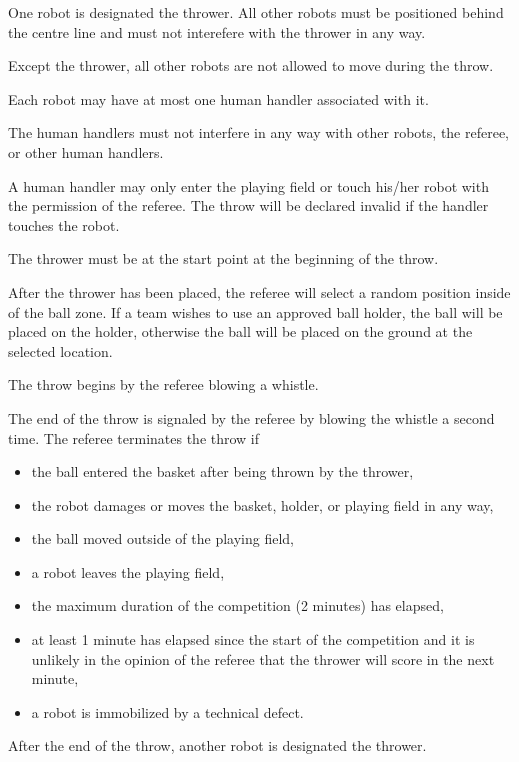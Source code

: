 \documentclass[12pt]{hurocup}
\begin{document}
\begin{lawlist}[BB]

 \item One robot is designated the thrower. All other robots must be
 positioned behind the centre line and must not interefere with the
 thrower in any way.

 \item Except the thrower, all other robots are not allowed to move
 during the throw.

 \item Each robot may have at most one human handler associated with
 it.

 \item \label{bb-handler1} The human handlers must not interfere in
 any way with other robots, the referee, or other human handlers.

 \item \label{bb-handler2} A human handler may only enter the playing
 field or touch his/her robot with the permission of the referee. The
 throw will be declared invalid if the handler touches the robot.

 \item The thrower must be at the start point at the beginning of the
 throw. 

 \item After the thrower has been placed, the referee will select a
   random position inside of the ball zone. If a team wishes to use an
   approved ball holder, the ball will be placed on the holder,
   otherwise the ball will be placed on the ground at the selected
   location.

 \item The throw begins by the referee blowing a whistle.

\item The end of the throw is signaled by the referee by
  blowing the whistle a second time.
  The referee terminates the throw if
  \begin{itemize}
  \item the ball entered the basket after being thrown by the thrower,
  \item the robot damages or moves the basket, holder, or playing
    field in any way,
  \item the ball moved outside of the playing field,
  \item a robot leaves the playing field,
  \item the maximum duration of the competition (2 minutes) has elapsed,
  \item at least 1 minute has elapsed since the start of the
    competition and it is unlikely in the opinion of the referee that
    the thrower will score in the next minute,
  \item a robot is immobilized by a technical defect.
  \end{itemize}

\item After the end of the throw, another robot is designated the
 thrower. 

\end{lawlist}
\end{document}
